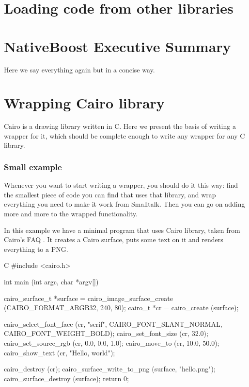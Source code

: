 \documentclass[a4paper,10pt,twoside]{book}
\begin{document}
\section{Loading code from other libraries}


\section{NativeBoost Executive Summary}

Here we say everything again but in a  concise way.

\section{Wrapping Cairo library}

Cairo is a drawing library written in C. Here we present the basis of writing a wrapper for it, which should be
complete enough to write any wrapper for any C library.


\subsubsection*{Small example}

Whenever you want to start writing a wrapper, you should do it this way: find the smallest piece of code you can find 
that uses that library, and wrap everything you need to make it work from Smalltalk. Then you can go on adding more and
more to the wrapped functionality. 

In this example we have a minimal program that uses Cairo library, taken from Cairo's FAQ .
It creates a Cairo surface, puts some text on it
and renders everything to a PNG.

\begin{code}{C}
#include <cairo.h>

int
main (int argc, char *argv[])
{
        cairo_surface_t *surface =
            cairo_image_surface_create (CAIRO_FORMAT_ARGB32, 240, 80);
        cairo_t *cr =
            cairo_create (surface);

        cairo_select_font_face (cr, "serif", CAIRO_FONT_SLANT_NORMAL, CAIRO_FONT_WEIGHT_BOLD);
        cairo_set_font_size (cr, 32.0);
        cairo_set_source_rgb (cr, 0.0, 0.0, 1.0);
        cairo_move_to (cr, 10.0, 50.0);
        cairo_show_text (cr, "Hello, world");

        cairo_destroy (cr);
        cairo_surface_write_to_png (surface, "hello.png");
        cairo_surface_destroy (surface);
        return 0;
}
\end{code}
\end{document}

